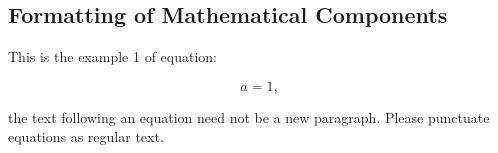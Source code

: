 \documentclass[vision,article,submit,pdftex,moreauthors]{Definitions/mdpi}
\begin{document}
\subsection{Formatting of Mathematical Components}

This is the example 1 of equation:
\begin{linenomath}
\begin{equation}
a = 1,
\end{equation}
\end{linenomath}
the text following an equation need not be a new paragraph. Please punctuate equations as regular text.


\end{document}
